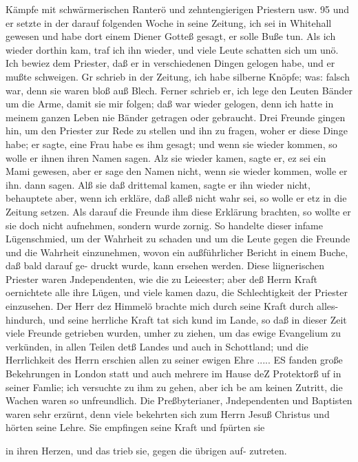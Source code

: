 Kämpfe mit schwärmerischen Ranterö und zehntengierigen Priestern usw. 95
und er setzte in der darauf folgenden Woche in seine Zeitung,
ich sei in Whitehall gewesen und habe dort einem Diener Gotteß
gesagt, er solle Buße tun. Als ich wieder dorthin kam, traf ich
ihn wieder, und viele Leute schatten sich um unö. Ich bewiez
dem Priester, daß er in verschiedenen Dingen gelogen habe, und
er mußte schweigen. Gr schrieb in der Zeitung, ich habe silberne
Knöpfe; was: falsch war, denn sie waren bloß auß Blech. Ferner
schrieb er, ich lege den Leuten Bänder um die Arme, damit sie
mir folgen; daß war wieder gelogen, denn ich hatte in meinem
ganzen Leben nie Bänder getragen oder gebraucht. Drei Freunde
gingen hin, um den Priester zur Rede zu stellen und ihn zu
fragen, woher er diese Dinge habe; er sagte, eine Frau habe es
ihm gesagt; und wenn sie wieder kommen, so wolle er ihnen ihren
Namen sagen. Alz sie wieder kamen, sagte er, ez sei ein Mami
gewesen, aber er sage den Namen nicht, wenn sie wieder kommen,
wolle er ihn. dann sagen. Alß sie daß drittemal kamen, sagte
er ihn wieder nicht, behauptete aber, wenn ich erkläre, daß alleß
nicht wahr sei, so wolle er etz in die Zeitung setzen. Als darauf
die Freunde ihm diese Erklärung brachten, so wollte er sie doch
nicht aufnehmen, sondern wurde zornig. So handelte dieser
infame Lügenschmied, um der Wahrheit zu schaden und um die
Leute gegen die Freunde und die Wahrheit einzunehmen, wovon
ein außführlicher Bericht in einem Buche, daß bald darauf ge-
druckt wurde, kann ersehen werden. Diese liignerischen Priester
waren Jndependenten, wie die zu Leieester; aber deß Herrn
Kraft oernichtete alle ihre Lügen, und viele kamen dazu, die
Schlechtigkeit der Priester einzusehen. Der Herr dez Himmelö
brachte mich durch seine Kraft durch alles- hindurch, und seine
herrliche Kraft tat sich kund im Lande, so daß in dieser Zeit
viele Freunde getrieben wurden, umher zu ziehen, um das ewige
Evangelium zu verkünden, in allen Teilen detß Landes und auch
in Schottland; und die Herrlichkeit des Herrn erschien allen zu
seiner ewigen Ehre ..... ES fanden große Bekehrungen in
London statt und auch mehrere im Hause deZ Protektorß uf in
seiner Famlie; ich versuchte zu ihm zu gehen, aber ich be am
keinen Zutritt, die Wachen waren so unfreundlich.
Die Preßbyterianer, Jndependenten und Baptisten waren sehr
erzürnt, denn viele bekehrten sich zum Herrn Jesuß Christus und
hörten seine Lehre. Sie empfingen seine Kraft und fpürten sie


in ihren Herzen, und das trieb sie, gegen die übrigen auf-
zutreten.
